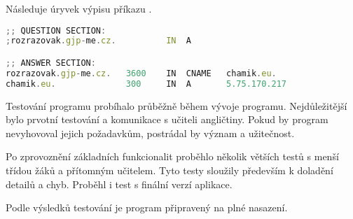 Následuje úryvek výpisu příkazu .

\begin{lstlisting}[language=JavaScript,caption={Úryvek výpisu programu dig}]
;; QUESTION SECTION:
;rozrazovak.gjp-me.cz.		    IN	A

;; ANSWER SECTION:
rozrazovak.gjp-me.cz.	3600    IN	CNAME	chamik.eu.
chamik.eu.		        300	    IN	A	    5.75.170.217
\end{lstlisting}

Testování programu probíhalo průběžně během vývoje programu. Nejdůležitější bylo prvotní testování a komunikace s učiteli angličtiny. Pokud by program nevyhovoval jejich požadavkům, postrádal by význam a užitečnost.

Po zprovoznění základních funkcionalit proběhlo několik větších testů s menší třídou žáků a přítomným učitelem. Tyto testy sloužily především k doladění detailů a chyb. Proběhl i test s finální verzí aplikace.

Podle výsledků testování je program připravený na plné nasazení.